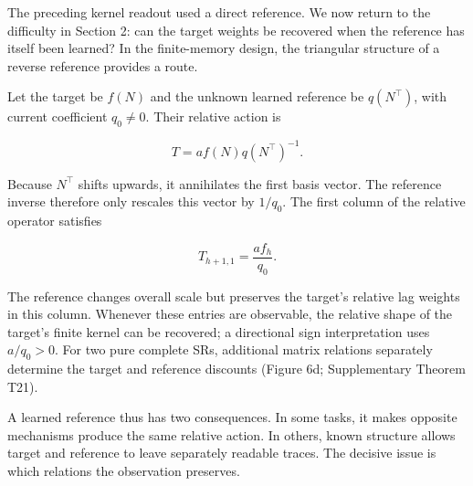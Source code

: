 \documentclass[11pt,a4paper]{article}
\begin{document}
The preceding kernel readout used a direct reference. We now return to
the difficulty in Section 2: can the target weights be recovered when
the reference has itself been learned? In the finite-memory design, the
triangular structure of a reverse reference provides a route.

\par
\noindent\begin{minipage}{\linewidth}

Let the target be \(f(N)\) and the unknown learned reference be
\(q(N^\top)\), with current coefficient \(q_0\neq0\). Their relative
action is

\[
T=af(N)q(N^\top)^{-1}.
\]

\end{minipage}\par

\par
\noindent\begin{minipage}{\linewidth}

Because \(N^\top\) shifts upwards, it annihilates the first basis
vector. The reference inverse therefore only rescales this vector by
\(1/q_0\). The first column of the relative operator satisfies

\[
T_{h+1,1}=\frac{af_h}{q_0}.
\]

\end{minipage}\par

The reference changes overall scale but preserves the target's relative
lag weights in this column. Whenever these entries are observable, the
relative shape of the target's finite kernel can be recovered; a
directional sign interpretation uses \(a/q_0>0\). For two pure complete
SRs, additional matrix relations separately determine the target and
reference discounts (Figure 6d; Supplementary Theorem T21).

A learned reference thus has two consequences. In some tasks, it makes
opposite mechanisms produce the same relative action. In others, known
structure allows target and reference to leave separately readable
traces. The decisive issue is which relations the observation preserves.
\end{document}
